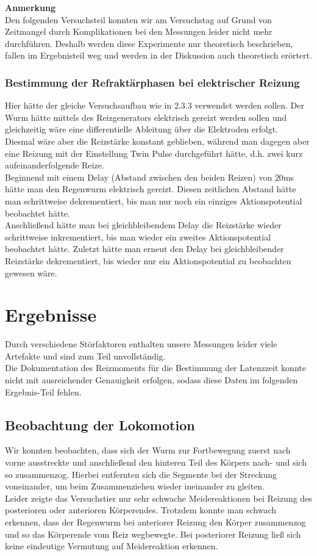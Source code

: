 \documentclass[11pt]{article}
\begin{document}
\textbf{Anmerkung}\\
Den folgenden Versuchsteil konnten wir am Versuchstag auf Grund von Zeitmangel durch Komplikationen bei den Messungen leider nicht mehr durchführen. Deshalb werden diese Experimente nur theoretisch beschrieben, fallen im Ergebnisteil weg und werden in der Diskussion auch theoretisch erörtert. 



\subsubsection{Bestimmung der Refraktärphasen bei elektrischer Reizung}
Hier hätte der gleiche Versuchsaufbau wie in 2.3.3 verwendet werden sollen. Der Wurm hätte mittels des Reizgenerators elektrisch gereizt werden sollen und gleichzeitig wäre eine differentielle Ableitung über die Elektroden erfolgt. \\
Diesmal wäre aber die Reizstärke konstant geblieben, während man dagegen aber eine Reizung mit der Einstellung \glqq Twin Pulse\grqq{} durchgeführt hätte, d.h. zwei kurz aufeinanderfolgende Reize. \\
Beginnend mit einem Delay (Abstand zwischen den beiden Reizen) von $20$ms hätte man den Regenwurm elektrisch gereizt. Diesen zeitlichen Abstand hätte man schrittweise dekrementiert, bis man nur noch ein einziges Aktionspotential beobachtet hätte. \\
Anschließend hätte man bei gleichbleibendem Delay die Reizstärke wieder schrittweise inkrementiert, bis man wieder ein zweites Aktionspotential beobachtet hätte. Zuletzt hätte man erneut den Delay bei gleichbleibender Reizstärke dekrementiert, bis wieder nur ein Aktionspotential zu beobachten gewesen wäre. 


\section{Ergebnisse}
Durch verschiedene Störfaktoren enthalten unsere Messungen leider viele Artefakte und sind zum Teil unvollständig.  \\
Die Dokumentation des Reizmoments für die Bestimmung der Latenzzeit konnte nicht mit ausreichender Genauigkeit erfolgen, sodass diese Daten im folgenden Ergebnis-Teil fehlen. \\

\subsection{Beobachtung der Lokomotion}
Wir konnten beobachten, dass sich der Wurm zur Fortbewegung zuerst nach vorne ausstreckte und anschließend den hinteren Teil des Körpers nach- und sich so zusammenzog. Hierbei entfernten sich die Segmente bei der Streckung voneinander, um beim Zusammenziehen wieder ineinander zu gleiten.\\
Leider zeigte das Versuchstier nur sehr schwache Meidereaktionen bei Reizung des posterioren oder anterioren Körperendes. Trotzdem konnte man schwach erkennen, dass der Regenwurm bei anteriorer Reizung den Körper zusammenzog und so das Körperende vom Reiz wegbewegte. Bei posteriorer Reizung ließ sich keine eindeutige Vermutung auf Meidereaktion erkennen. 
\end{document}
